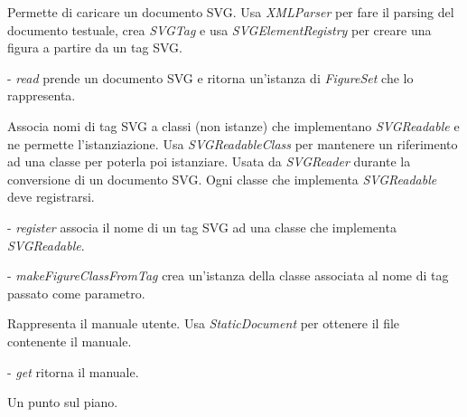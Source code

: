 Permette di caricare un documento SVG.
Usa \textit{XMLParser} per fare il parsing del documento testuale, crea \textit{SVGTag} e usa \textit{SVGElementRegistry} per creare una figura a partire da un tag SVG.
\begin{elencopuntato}[\normindent]
\item[-] \textit{read} prende un documento SVG e ritorna un'istanza di \textit{FigureSet} che lo rappresenta.
\end{elencopuntato}

Associa nomi di tag SVG a classi (non istanze) che implementano \textit{SVGReadable} e ne permette l'istanziazione. 
Usa \textit{SVGReadableClass} per mantenere un riferimento ad una classe per poterla poi istanziare.
Usata da \textit{SVGReader} durante la conversione di un documento SVG. Ogni classe che implementa \textit{SVGReadable} deve registrarsi.
\begin{elencopuntato}[\normindent]
\item[-] \textit{register} associa il nome di un tag SVG ad una classe che implementa \textit{SVGReadable}.
\item[-] \textit{makeFigureClassFromTag} crea un'istanza della classe associata al nome di tag passato come parametro.
\end{elencopuntato}

Rappresenta il manuale utente.
Usa \textit{StaticDocument} per ottenere il file contenente il manuale.
\begin{elencopuntato}[\normindent]
\item[-] \textit{get} ritorna il manuale.
\end{elencopuntato}

Un punto sul piano.

